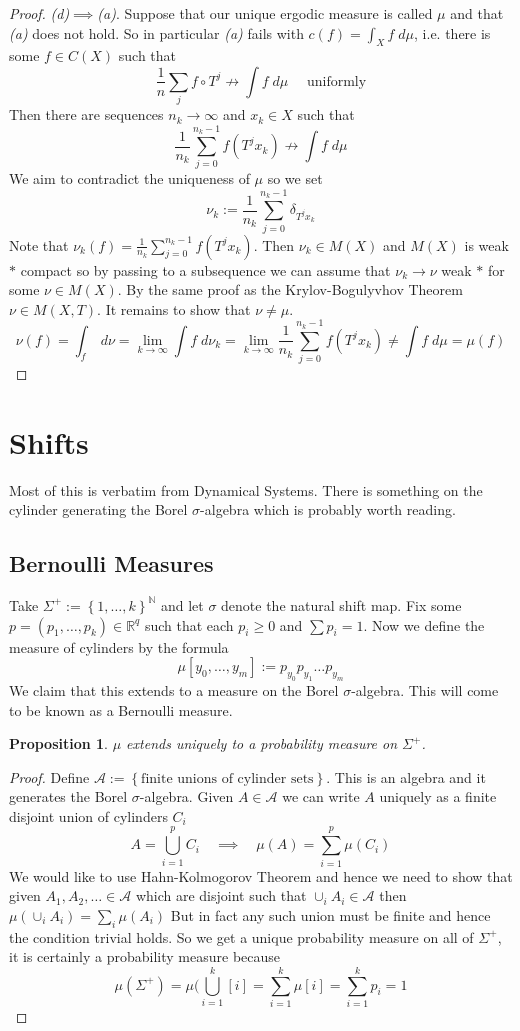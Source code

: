 \documentclass[11pt]{article}
\newcommand{\defeq}{:=}
\newcommand{\R}{\mathbb{R}}
\newcommand{\N}{\mathbb{N}}
\newcommand{\dm}{\;d\mu}
\newcommand{\mdf}[1]{{\color{red} #1}}
\newtheorem{prop}{Proposition}[section]
\begin{document}
\begin{proof}
\textit{(d)}$\implies$\textit{(a)}.
Suppose that our unique ergodic measure is called $\mu$ and that \textit{(a)} does not hold.
So in particular \textit{(a)} fails with $c(f) = \int_X f \dm$, i.e. there is some $f\in C(X)$ such that
\[
	\frac{1}{n}\sum_{j}f\circ T^j \not \to \int f \dm \quad\text{ uniformly}
\]
Then there are sequences $n_k\to \infty$ and $x_k\in X$ such that
\[
	\frac{1}{n_k}\sum_{j=0}^{n_k-1}f(T^jx_k) \not \to \int f \dm
\]
We aim to contradict the uniqueness of $\mu$ so we set 
\[
\nu_k \defeq \frac{1}{n_k}\sum_{j=0}^{n_k-1}\delta_{T^jx_k}
\]
Note that $\nu_k(f) = \frac{1}{n_k}\sum_{j=0}^{n_k-1}f(T^jx_k)$. 
Then $\nu_k\in M(X)$ and $M(X)$ is weak $\ast$ compact so by passing to a subsequence we can assume that $\nu_k\to \nu$ weak $\ast$ for some $\nu\in M(X)$.
By the same proof as the Krylov-Bogulyvhov Theorem $\nu\in M(X, T)$.
It remains to show that $\nu\neq \mu$.
\[
	\nu(f) = \int_f \; d\nu = \lim_{k\to\infty}\int f \; d\nu_k = \lim_{k\to\infty}\frac{1}{n_k}\sum_{j=0}^{n_k-1}f(T^jx_k) \neq \int f \dm = \mu (f)
\]
\end{proof}

\section{Shifts}
Most of this is verbatim from Dynamical Systems.
There is something on the cylinder generating the Borel $\sigma$-algebra which is probably worth reading.

\subsection{Bernoulli Measures}
Take $\Sigma^+ \defeq \left\{ 1, \dots, k\right\}^\N$ and let $\sigma$ denote the natural shift map.
Fix some $p=(p_1, \dots, p_k)\in \R^q$ such that each $p_i\geq 0$ and $\sum p_i=1$.
Now we define the measure of cylinders by the formula 
\[
	\mu[y_0, \dots, y_m] \defeq p_{y_0}p_{y_1}\dots p_{y_m}
\]
We claim that this extends to a measure on the Borel $\sigma$-algebra.
This will come to be known as a \mdf{Bernoulli measure}.

\begin{prop}
$\mu$ extends uniquely to a probability measure on $\Sigma^+$.
\end{prop}

\begin{proof}
Define $\mathcal{A}\defeq\left\{ \text{finite unions of cylinder sets}\right\}$.
This is an algebra and it generates the Borel $\sigma$-algebra.
Given $A\in\mathcal{A}$ we can write $A$ uniquely as a finite disjoint union of cylinders $C_i$
\[
	A = \bigcup_{i=1}^p C_i \quad \implies \quad \mu(A) = \sum_{i=1}^p \mu(C_i)
\]
We would like to use Hahn-Kolmogorov Theorem and hence we need to show that given $A_1, A_2, \dots \in \mathcal{A}$ which are disjoint such that $\cup_i A_i\in\mathcal{A}$ then $\mu(\cup_i A_i) = \sum_{i}\mu(A_i)$
But in fact any such union must be finite and hence the condition trivial holds.
So we get a unique probability measure on all of $\Sigma^+$, it is certainly a probability measure because
\[
	\mu(\Sigma^+) = \mu(\bigcup_{i=1}^k \left[ i\right] = \sum_{i=1}^k \mu\left[ i\right] =\sum_{i=1}^k p_i = 1
\]
\end{proof}
\end{document}
